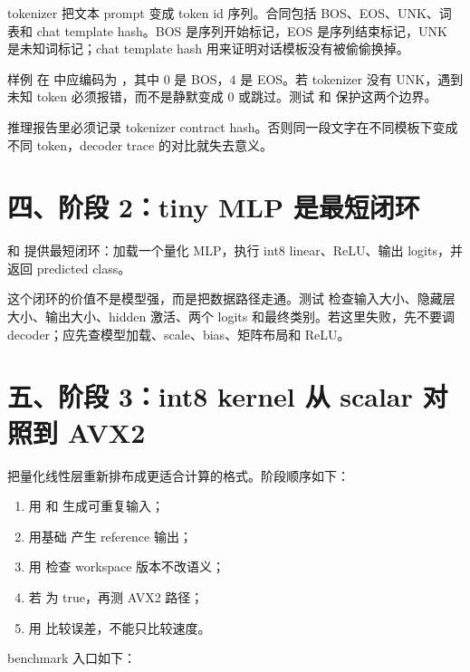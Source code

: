 tokenizer 把文本 prompt 变成 token id 序列。合同包括 BOS、EOS、UNK、词表和 chat template hash。BOS 是序列开始标记，EOS 是序列结束标记，UNK 是未知词标记；chat template hash 用来证明对话模板没有被偷偷换掉。

样例  在  中应编码为 \code{[0,1,2,3,4]}，其中 0 是 BOS，4 是 EOS。若 tokenizer 没有 UNK，遇到未知 token 必须报错，而不是静默变成 0 或跳过。测试  和  保护这两个边界。

推理报告里必须记录 tokenizer contract hash。否则同一段文字在不同模板下变成不同 token，decoder trace 的对比就失去意义。

\section{四、阶段 2：tiny MLP 是最短闭环}

 和  提供最短闭环：加载一个量化 MLP，执行 int8 linear、ReLU、输出 logits，并返回 predicted class。

这个闭环的价值不是模型强，而是把数据路径走通。测试  检查输入大小、隐藏层大小、输出大小、hidden 激活、两个 logits 和最终类别。若这里失败，先不要调 decoder；应先查模型加载、scale、bias、矩阵布局和 ReLU。

\section{五、阶段 3：int8 kernel 从 scalar 对照到 AVX2}

 把量化线性层重新排布成更适合计算的格式。阶段顺序如下：

\begin{enumerate}
  \item 用  和  生成可重复输入；
  \item 用基础  产生 reference 输出；
  \item 用  检查 workspace 版本不改语义；
  \item 若  为 true，再测 AVX2 路径；
  \item 用  比较误差，不能只比较速度。
\end{enumerate}

benchmark 入口如下：

